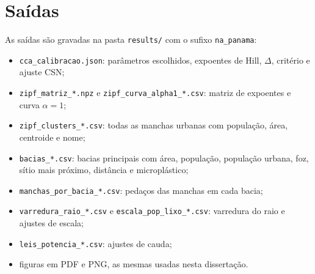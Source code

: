 \section{Saídas}

As saídas são gravadas na pasta \texttt{results/} com o sufixo \texttt{na\_panama}:

\begin{itemize}
	\item \texttt{cca\_calibracao.json}: parâmetros escolhidos, expoentes de Hill, $\Delta$, critério e ajuste CSN;
	\item \texttt{zipf\_matriz\_*.npz} e \texttt{zipf\_curva\_alpha1\_*.csv}: matriz de expoentes e curva $\alpha = 1$;
	\item \texttt{zipf\_clusters\_*.csv}: todas as manchas urbanas com população, área, centroide e nome;
	\item \texttt{bacias\_*.csv}: bacias principais com área, população, população urbana, foz, sítio mais próximo, distância e microplástico;
	\item \texttt{manchas\_por\_bacia\_*.csv}: pedaços das manchas em cada bacia;
	\item \texttt{varredura\_raio\_*.csv} e \texttt{escala\_pop\_lixo\_*.csv}: varredura do raio e ajustes de escala;
	\item \texttt{leis\_potencia\_*.csv}: ajustes de cauda;
	\item figuras em PDF e PNG, as mesmas usadas nesta dissertação.
\end{itemize}
